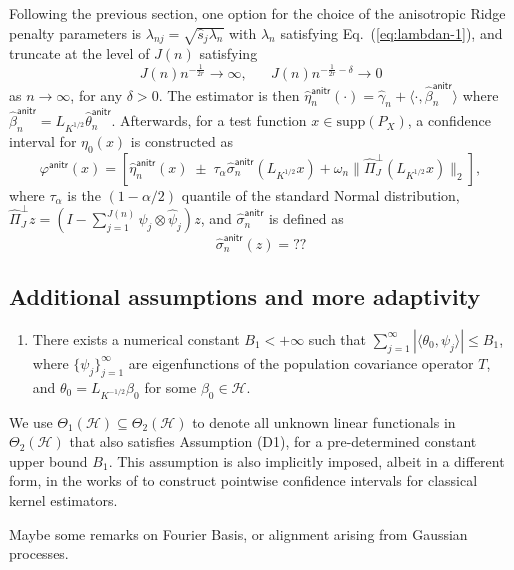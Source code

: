 \documentclass[11pt,a4paper]{article}
\renewcommand{\hat}{\widehat}
\theoremstyle{definition}
\theoremstyle{plain}
\theoremstyle{remark}
\newcommand{\supp}{\mathrm{supp}}
\newcommand{\mH}{\mathcal H}
\newcommand{\anitr}{\mathsf{anitr}}
\begin{document}
Following the previous section, one option for the choice of the anisotropic Ridge penalty parameters is $\lambda_{nj}=\sqrt{\hat s_j\lambda_n}$ with $\lambda_n$ satisfying Eq.~(\ref{eq:lambdan-1}),
and truncate at the level of $J(n)$ satisfying
\begin{equation}
J(n)n^{-\frac{1}{2r}}\to\infty,\;\;\;\;\;\;J(n)n^{-\frac{1}{2r}-\delta}\to 0
\label{eq:J1}
\end{equation}
as $n\to\infty$, for any $\delta>0$.
The estimator is then $\hat\eta_n^\anitr(\cdot)=\hat\gamma_n + \langle\cdot,\hat\beta_n^\anitr\rangle$ where $\hat\beta_n^\anitr = L_{K^{1/2}}\hat\theta_n^\anitr$.
Afterwards, for a test function $x\in\supp(P_X)$, a confidence interval for $\eta_0(x)$ is constructed as
$$
\varphi^\anitr(x) = [\hat\eta_n^\anitr(x)\;\pm\; \tau_{\alpha}\hat\sigma_n^\anitr(L_{K^{1/2}}x) + \omega_n\|\hat\Pi_J^\perp (L_{K^{1/2}}x)\|_2],
$$
where $\tau_{\alpha}$ is the $(1-\alpha/2)$ quantile of the standard Normal distribution, $\hat\Pi_J^\perp z=(I-\sum_{j=1}^{J(n)}\hat\psi_j\otimes\hat\psi_j)z$, and $\hat\sigma_n^\anitr$ is defined as
$$
\hat\sigma_n^\anitr(z) = ??
$$

\subsection{Additional assumptions and more adaptivity}

\begin{enumerate}
\item[(C1)] There exists a numerical constant $B_1<+\infty$ such that $\sum_{j=1}^{\infty}|\langle \theta_0, \psi_j\rangle| \leq B_1$, where $\{\psi_j\}_{j=1}^{\infty}$ are eigenfunctions of the population covariance operator $T$,
and $\theta_0=L_{K^{-1/2}}\beta_0$ for some $\beta_0\in\mH$.
\end{enumerate}
We use $\Theta_1(\mH)\subseteq\Theta_2(\mH)$ to denote all unknown linear functionals in $\Theta_2(\mH)$ that also satisfies Assumption (D1), for a pre-determined constant upper bound $B_1$.
This assumption is also implicitly imposed, albeit in a different form, in the works of \cite{liu2025scalable} to construct pointwise confidence intervals for classical kernel estimators.

{\color{red}Maybe some remarks on Fourier Basis, or alignment arising from Gaussian processes.}
\end{document}
